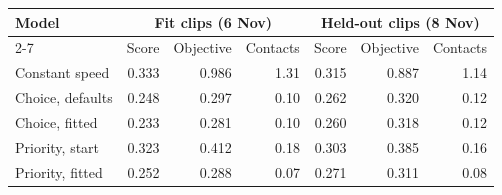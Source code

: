 \begin{tabular}{|l|r|r|r|r|r|r|}
\hline
\multirow{2}{*}{\textbf{Model}} & \multicolumn{3}{c|}{\textbf{Fit clips (6 Nov)}} & \multicolumn{3}{c|}{\textbf{Held-out clips (8 Nov)}} \\
\cline{2-7}
 & Score & Objective & Contacts & Score & Objective & Contacts \\
\hline
Constant speed & 0.333 & 0.986 & 1.31 & 0.315 & 0.887 & 1.14 \\
Choice, defaults & 0.248 & 0.297 & 0.10 & 0.262 & 0.320 & 0.12 \\
Choice, fitted & 0.233 & 0.281 & 0.10 & 0.260 & 0.318 & 0.12 \\
Priority, start & 0.323 & 0.412 & 0.18 & 0.303 & 0.385 & 0.16 \\
Priority, fitted & 0.252 & 0.288 & 0.07 & 0.271 & 0.311 & 0.08 \\
\hline
\end{tabular}
